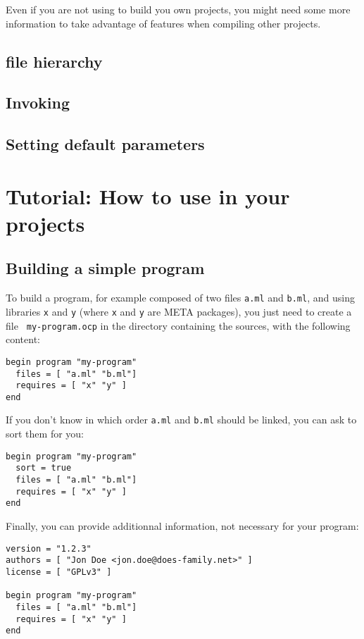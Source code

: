 Even if you are not using \ocpbuild{} to build you own projects, you
might need some more information to take advantage of \ocpbuild{}
features when compiling other projects.

\section{\ocpbuild{} file hierarchy}

\section{Invoking \ocpbuild{}}

\section{Setting \ocpbuild{} default parameters}

\chapter{Tutorial: How to use \ocpbuild{} in your projects}

\section{Building a simple program}

To build a program, for example composed of two files {\tt a.ml} and
{\tt b.ml}, and using libraries {\tt x} and {\tt y} (where {\tt x} and
{\tt y} are META packages), you just need to create a file {\tt
  my-program.ocp} in the directory containing the sources, with the
following content:

\begin{verbatim}
begin program "my-program"
  files = [ "a.ml" "b.ml"]
  requires = [ "x" "y" ]
end
\end{verbatim}

If you don't know in which order {\tt a.ml} and {\tt b.ml} should be
linked, you can ask \ocpbuild{} to sort them for you:

\begin{verbatim}
begin program "my-program"
  sort = true
  files = [ "a.ml" "b.ml"]
  requires = [ "x" "y" ]
end
\end{verbatim}

Finally, you can provide additionnal information, not necessary for
your program:
\begin{verbatim}
version = "1.2.3"
authors = [ "Jon Doe <jon.doe@does-family.net>" ]
license = [ "GPLv3" ]

begin program "my-program"
  files = [ "a.ml" "b.ml"]
  requires = [ "x" "y" ]
end
\end{verbatim}

